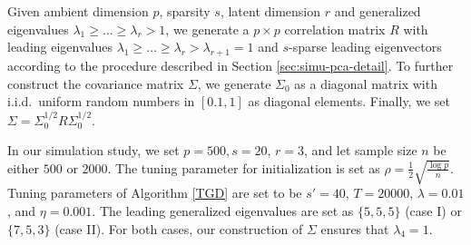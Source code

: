 \documentclass[11pt]{article}
\newcommand{\0}{{\mathbf{0}}}
\begin{document}

Given ambient dimension $p$, sparsity $s$, latent dimension $r$ and generalized eigenvalues $\lambda_1\geq \dots\geq \lambda_r > 1$, we generate a $p\times p$ correlation matrix $R$ with leading eigenvalues $\lambda_1\geq \dots\geq \lambda_r > \lambda_{r+1} = 1$ and $s$-sparse leading eigenvectors according to the procedure described in Section \ref{sec:simu-pca-detail}.
To further construct the covariance matrix $\Sigma$, we 
generate $\Sigma_0$ as a diagonal matrix with i.i.d.~uniform random numbers in $[0.1,1]$ as diagonal elements. 
Finally, we set $\Sigma=\Sigma_0^{1/2}R\Sigma_0^{1/2}$. 



In our simulation study, we set $p=500, s=20$, $r=3$, and let sample size $n$ be either $500$ or $2000$. 
The tuning parameter for initialization is set as $\rho=\frac{1}{2}\sqrt{\frac{\log p}{n}}$. 
Tuning parameters of Algorithm \ref{TGD} are set to be
$s'=40$, $T=20000$, $\lambda=0.01$, and $\eta=0.001$.
The leading generalized eigenvalues are set as $\{5,5,5\}$ (case I) or $\{7,5,3\}$ (case II).
For both cases, our construction of $\Sigma$ ensures that $\lambda_4 = 1$.
\end{document}
